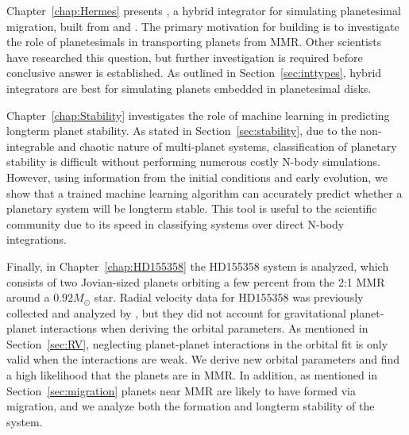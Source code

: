 Chapter~\ref{chap:Hermes} presents \hermes, a hybrid integrator for simulating planetesimal migration, built from \ias \citep{Rein2015a} and \whfast \citep{Rein2015b}. 
The primary motivation for building \hermes is to investigate the role of planetesimals in transporting planets from MMR. 
Other scientists \citep{Chatterjee2015} have researched this question, but further investigation is required before conclusive answer is established.
As outlined in Section~\ref{sec:inttypes}, hybrid integrators are best for simulating planets embedded in planetesimal disks. 

Chapter~\ref{chap:Stability} investigates the role of machine learning in predicting longterm planet stability. 
As stated in Section~\ref{sec:stability}, due to the non-integrable and chaotic nature of multi-planet systems, classification of planetary stability is difficult without performing numerous costly N-body simulations. 
However, using information from the initial conditions and early evolution, we show that a trained machine learning algorithm can accurately predict whether a planetary system will be longterm stable.  
This tool is useful to the scientific community due to its speed in classifying systems over direct N-body integrations.  

Finally, in Chapter~\ref{chap:HD155358} the HD155358 system is analyzed, which consists of two Jovian-sized planets orbiting a few percent from the 2:1 MMR around a $0.92M_{\odot}$ star. 
Radial velocity data for HD155358 was previously collected and analyzed by \citet{Robertson2012}, but they did not account for gravitational planet-planet interactions when deriving the orbital parameters.
As mentioned in Section~\ref{sec:RV}, neglecting planet-planet interactions in the orbital fit is only valid when the interactions are weak. 
We derive new orbital parameters and find a high likelihood that the planets are in MMR.
In addition, as mentioned in Section~\ref{sec:migration} planets near MMR are likely to have formed via migration, and we analyze both the formation and longterm stability of the system. 
